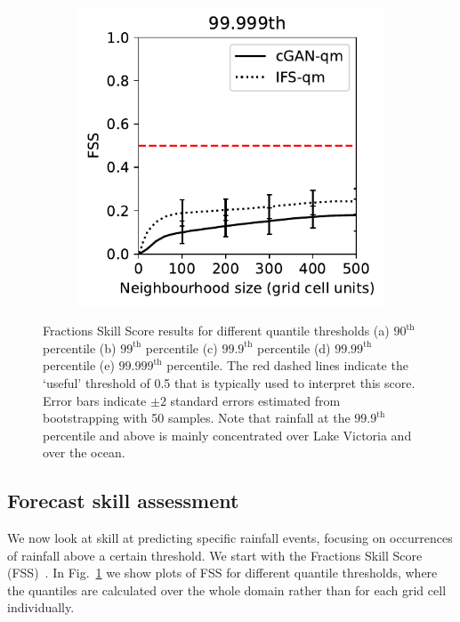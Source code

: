 \documentclass{article}
\begin{document}
\begin{figure}[t]
\begin{subfigure}[t]{0.32\textwidth}
     \caption{}
     \end{subfigure}
     \begin{subfigure}[t]{0.32\textwidth}
     \includegraphics[width=\textwidth]{images/fss_q99.999th_final-nologs_217600.pdf}
     \caption{}
     \end{subfigure}
     \caption{Fractions Skill Score results for different quantile thresholds (a) $90^{\text{th}}$ percentile (b) $99^{\text{th}}$ percentile (c) $99.9^{\text{th}}$ percentile (d) $99.99^{\text{th}}$ percentile (e) $99.999^{\text{th}}$ percentile. The red dashed lines indicate the `useful' threshold of 0.5 that is typically used to interpret this score. Error bars indicate $\pm2$ standard errors estimated from bootstrapping with 50 samples. Note that rainfall at the $99.9^{\text{th}}$ percentile and above is mainly concentrated over Lake Victoria and over the ocean. }
     \label{fig:fss}
\end{figure}




\subsection{Forecast skill assessment}


We now look at skill at predicting specific rainfall events, focusing on occurrences of rainfall above a certain threshold. We start with the Fractions Skill Score (FSS)~\citep{roberts_assessing_2008, roberts_scale-selective_2008}. In Fig.~\ref{fig:fss} we show plots of FSS for different quantile thresholds, where the quantiles are calculated over the whole domain rather than for each grid cell individually.
\end{document}
